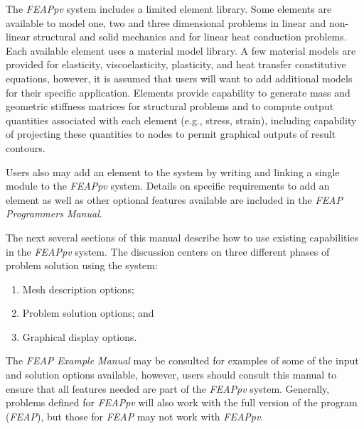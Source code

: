 The {\sl FEAPpv} system includes a limited element library.
Some elements are available to model one, two and three dimensional problems
in linear and non-linear
structural and solid mechanics and for linear heat conduction problems.
Each available element uses a material
model library. A few material models are provided for elasticity,
viscoelasticity, plasticity, and heat transfer constitutive equations,
however, it is assumed that users will want to add additional models for
their specific application.
Elements provide capability to generate mass and
geometric stiffness matrices for structural problems and to compute output
quantities associated with each element (e.g., stress, strain), including
capability of projecting these quantities to nodes to permit graphical
outputs of result contours.

Users also may add an element to the system by writing and linking a single
module to the {\sl FEAPpv} system. Details on
specific requirements to add an element as well as other optional
features available are included in the
{\sl FEAP Programmers Manual}.

The next several sections of this manual describe how to use existing
capabilities in the {\sl FEAPpv} system.  The discussion
centers on three different phases of problem solution using the system:
\begin{enumerate}
\item Mesh description options;
\item Problem solution options; and
\item Graphical display options.
\end{enumerate}
The {\sl FEAP Example Manual}
may be consulted for examples of some of the input and solution
options available, however, users should consult this manual to ensure that
all features needed are part of the \textsl{FEAPpv} system.
Generally, problems defined for \textsl{FEAPpv} will also work with the full version
of the program (\textsl{FEAP}), but those for \textsl{FEAP} may not work with
\textsl{FEAPpv}.
